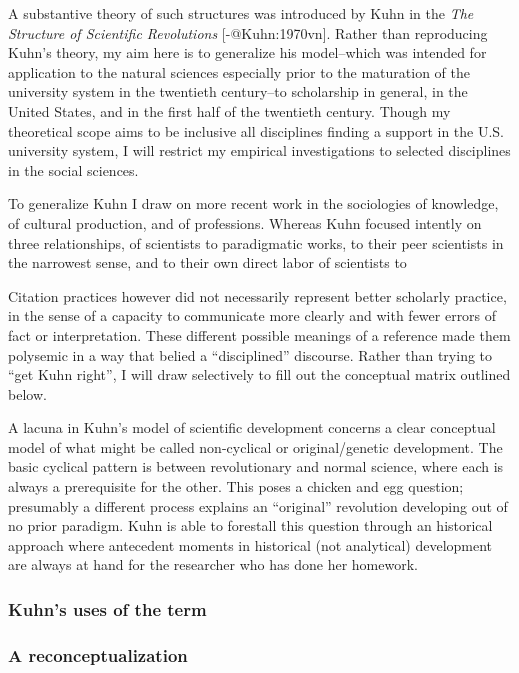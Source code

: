 \documentclass[]{article}
\begin{document}
A substantive theory of such structures was introduced by Kuhn in the
\emph{The Structure of Scientific Revolutions} {[}-@Kuhn:1970vn{]}.
Rather than reproducing Kuhn's theory, my aim here is to generalize his
model--which was intended for application to the natural sciences
especially prior to the maturation of the university system in the
twentieth century--to scholarship in general, in the United States, and
in the first half of the twentieth century. Though my theoretical scope
aims to be inclusive all disciplines finding a support in the U.S.
university system, I will restrict my empirical investigations to
selected disciplines in the social sciences.

To generalize Kuhn I draw on more recent work in the sociologies of
knowledge, of cultural production, and of professions. Whereas Kuhn
focused intently on three relationships, of scientists to paradigmatic
works, to their peer scientists in the narrowest sense, and to their own
direct labor of scientists to

Citation practices however did not necessarily represent better
scholarly practice, in the sense of a capacity to communicate more
clearly and with fewer errors of fact or interpretation. These different
possible meanings of a reference made them polysemic in a way that
belied a ``disciplined'' discourse. Rather than trying to ``get Kuhn
right'', I will draw selectively to fill out the conceptual matrix
outlined below.

A lacuna in Kuhn's model of scientific development concerns a clear
conceptual model of what might be called non-cyclical or
original/genetic development. The basic cyclical pattern is between
revolutionary and normal science, where each is always a prerequisite
for the other. This poses a chicken and egg question; presumably a
different process explains an ``original'' revolution developing out of
no prior paradigm. Kuhn is able to forestall this question through an
historical approach where antecedent moments in historical (not
analytical) development are always at hand for the researcher who has
done her homework.

\subsubsection{Kuhn's uses of the term}\label{kuhns-uses-of-the-term}

\subsubsection{A reconceptualization}\label{a-reconceptualization}
\end{document}
